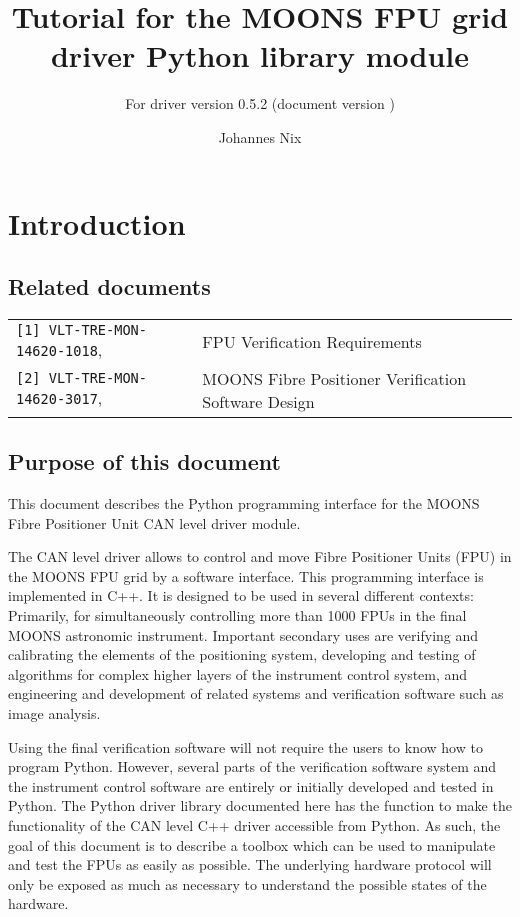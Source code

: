\documentclass{scrartcl}[12pt,a4paper]
\begin{document}
\title{Tutorial for the MOONS FPU grid driver Python library
  module} \subtitle{For driver version 0.5.2 (document version \texttt{})}

\author{Johannes Nix}

\maketitle

\tableofcontents


\section{Introduction}
\subsection{Related documents}

\begin{tabular}{|ll|}
  \hline
\verb+[1] VLT-TRE-MON-14620-1018+, &  FPU Verification Requirements \\
\verb+[2] VLT-TRE-MON-14620-3017+, & MOONS Fibre Positioner Verification Software Design \\
\hline
\end{tabular}


\subsection{Purpose of this document}
This document describes the Python programming interface for the MOONS
Fibre Positioner Unit CAN level driver module.

The CAN level driver allows to control and move Fibre Positioner Units
(FPU) in the MOONS FPU grid by a software interface. This programming
interface is implemented in C++. It is designed to be used in several
different contexts: Primarily, for simultaneously controlling more
than 1000 FPUs in the final MOONS astronomic instrument. Important
secondary uses are verifying and calibrating the elements of the
positioning system, developing and testing of algorithms for complex
higher layers of the instrument control system, and engineering and
development of related systems and verification software such as image
analysis.

Using the final verification software will not require the users to
know how to program Python.  However, several parts of the
verification software system and the instrument control software are
entirely or initially developed and tested in Python.  The Python
driver library documented here has the function to make the
functionality of the CAN level C++ driver accessible from Python. As
such, the goal of this document is to describe a toolbox which can be
used to manipulate and test the FPUs as easily as possible. The
underlying hardware protocol will only be exposed as much as necessary
to understand the possible states of the hardware.
\end{document}

